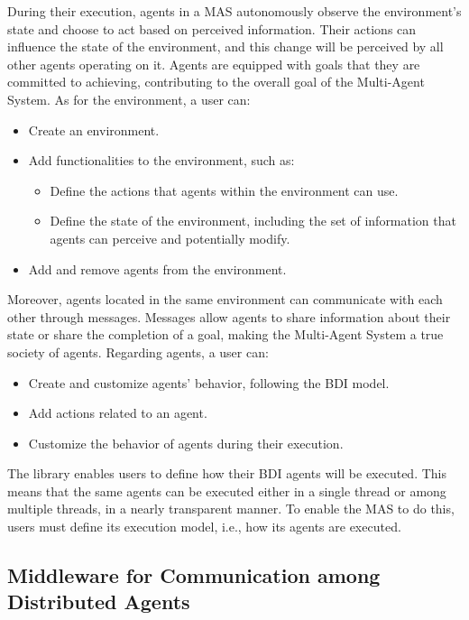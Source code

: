 During their execution, agents in a MAS autonomously observe the environment's state and choose to act based on perceived information. Their actions can influence the state of the environment, and this change will be perceived by all other agents operating on it. Agents are equipped with goals that they are committed to achieving, contributing to the overall goal of the Multi-Agent System. As for the environment, a user can:

\begin{itemize}
    \item Create an environment.
    \item Add functionalities to the environment, such as:
    \begin{itemize}
        \item Define the actions that agents within the environment can use.
        \item Define the state of the environment, including the set of information that agents can perceive and potentially modify.
    \end{itemize}
    \item Add and remove agents from the environment.
\end{itemize}

Moreover, agents located in the same environment can communicate with each other through messages. Messages allow agents to share information about their state or share the completion of a goal, making the Multi-Agent System a true society of agents. Regarding agents, a user can:

\begin{itemize}
    \item Create and customize agents' behavior, following the BDI model.
    \item Add actions related to an agent.
    \item Customize the behavior of agents during their execution.
\end{itemize}

The library enables users to define how their BDI agents will be executed. This means that the same agents can be executed either in a single thread or among multiple threads, in a nearly transparent manner. To enable the MAS to do this, users must define its execution model, i.e., how its agents are executed.

\subsection{Middleware for Communication among Distributed Agents}

